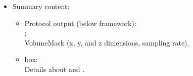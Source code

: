\begin{itemize}
 \item Summary content:
  \begin{itemize}
     \item Protocol output (below \scipion framework):\\ ;\\ VolumeMask (x, y, and z dimensions, sampling rate).
     \item {} box:\\ Details about  and .
    \end{itemize}
    
 \end{itemize}
